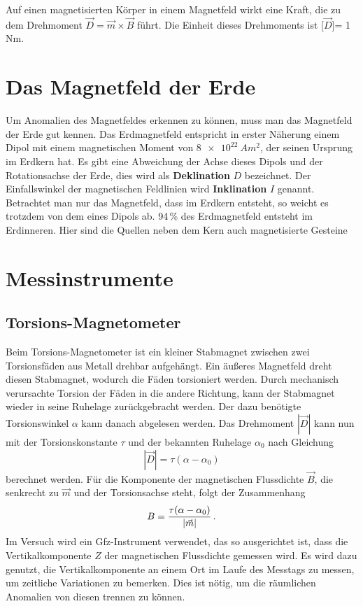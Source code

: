 Auf einen magnetisierten Körper in einem Magnetfeld wirkt eine Kraft, die zu dem Drehmoment $\vec{D} = \vec{m} \times \vec{B}$ führt. Die Einheit dieses Drehmoments ist [$\vec{D}$]= 1 Nm.

\section{Das Magnetfeld der Erde}
Um Anomalien des Magnetfeldes erkennen zu können, muss man das Magnetfeld der Erde gut kennen.
Das Erdmagnetfeld entspricht in erster Näherung einem Dipol mit einem magnetischen Moment von $\SI{8 e22}{Am^2}$, der seinen Ursprung im Erdkern hat. Es gibt eine Abweichung der Achse dieses Dipols und der 
Rotationsachse der Erde, dies wird als \textbf{Deklination} $D$ bezeichnet. 
Der Einfallswinkel der magnetischen Feldlinien wird \textbf{Inklination} $I$ genannt.
Betrachtet man nur das Magnetfeld, dass im Erdkern entsteht, so weicht es trotzdem von dem eines Dipols ab. 94\,\% des Erdmagnetfeld entsteht im Erdinneren. Hier sind die Quellen neben dem Kern auch magnetisierte Gesteine 

\section{Messinstrumente}

\subsection{Torsions-Magnetometer}

Beim Torsions-Magnetometer ist ein kleiner Stabmagnet zwischen zwei Torsionsfäden aus Metall drehbar aufgehängt. Ein äußeres Magnetfeld dreht diesen Stabmagnet, wodurch die Fäden torsioniert werden. Durch mechanisch verursachte Torsion der Fäden in die andere Richtung, kann der Stabmagnet wieder in seine Ruhelage zurückgebracht werden. Der dazu benötigte Torsionswinkel $\alpha$ kann danach abgelesen werden. Das Drehmoment $|\vec{D}|$ kann nun mit der Torsionskonstante $\tau$ und der bekannten Ruhelage $\alpha_0$ nach Gleichung
\begin{equation}
 |\vec{D}|=\tau(\alpha-\alpha_0)
\end{equation}
berechnet werden. Für die Komponente der magnetischen Flussdichte $\vec{B}$, die senkrecht zu $\vec{m}$ und der Torsionsachse steht, folgt der Zusammenhang
\begin{equation}
 B=\frac{\tau(\alpha-\alpha_0)}{|\vec{m}|} \text{\,.}
 \label{eq:Umrechnung_Torsion}
\end{equation}
Im Versuch wird ein Gfz-Instrument verwendet, das so ausgerichtet ist, dass die Vertikalkomponente $Z$ der magnetischen Flussdichte gemessen wird. Es wird dazu genutzt, die Vertikalkomponente an einem Ort im Laufe des Messtags zu messen, um zeitliche Variationen zu bemerken. Dies ist nötig, um die räumlichen Anomalien von diesen trennen zu können.

